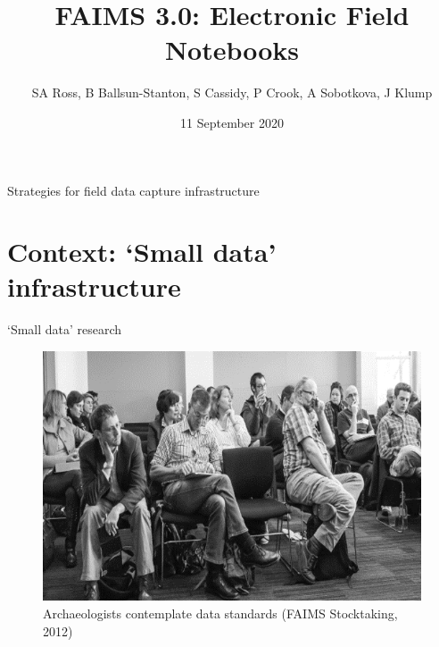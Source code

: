 \documentclass[aspectratio=169, 12pt]{beamer} %
\title{FAIMS 3.0: Electronic Field Notebooks} %
\author{SA Ross, B Ballsun-Stanton, S Cassidy, P Crook, A Sobotkova, J Klump}   %
\institute{CAA Australasia Online Conference}   %
\date{11 September 2020}    %
\begin{document}

\maketitle

 

\begin{frame}{Strategies for field data capture infrastructure}
  \tableofcontents
\end{frame}

%



\section{Context: `Small data' infrastructure}

\begin{frame}{`Small data' research}
 \begin{figure}[H]
    \centering
        \includegraphics[height=.75\textheight]{figures/Archaeologists-standards.png}
        \caption{Archaeologists contemplate data standards (FAIMS Stocktaking, 2012)}
        \label{fig:figure7}
 \end{figure}
\end{frame}
\end{document}
